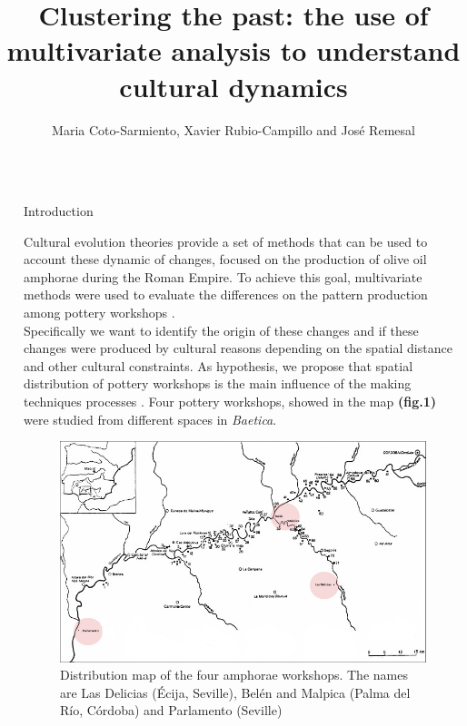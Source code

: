 \documentclass[final]{beamer}
\title{Clustering the past: the use of multivariate analysis to understand cultural dynamics} %
\author{Maria Coto-Sarmiento, Xavier Rubio-Campillo and Jos\'e Remesal} %
\institute{Barcelona Supercomputing Center - University of Barcelona} %
\newlength{\sepwid}
\newlength{\onecolwid}
\begin{document}

\setlength{\belowcaptionskip}{2ex} %
\setlength\belowdisplayshortskip{2ex} %

\begin{frame}[t] %

\begin{columns}[t] %

\begin{column}{\sepwid}\end{column} %

\begin{column}{\onecolwid} %


\begin{block}{Introduction}

Cultural evolution theories \cite{mesoudi} provide a set of methods that can be used to account these dynamic of changes, focused on the production of olive oil amphorae during the Roman Empire. 
To achieve this goal, multivariate methods were used to evaluate the differences on the pattern production among pottery workshops \cite{agui}. \\
Specifically we want to identify the origin of these changes and if these changes were produced by cultural reasons depending on the spatial distance and other cultural constraints. As hypothesis, we propose that spatial distribution of pottery workshops is the main influence of the making techniques processes \cite{schillinger}. Four pottery workshops, showed in the map \textbf{(fig.1)} were studied from different spaces in \emph{Baetica}. 
\end{block}

\begin{figure}
\includegraphics[width=0.6\linewidth]{fig1.png}
\caption{Distribution map of the four amphorae workshops. The names  are Las Delicias (\'Ecija, Seville), Bel\'en and Malpica (Palma del R\'io, C\'ordoba) and Parlamento (Seville)}
\end{figure}



\end{column}
\end{columns}
\end{frame}
\end{document}
